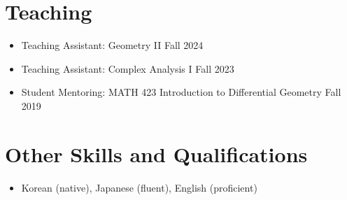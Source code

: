 \documentclass[11pt,a4paper]{article}
\begin{document}
\section*{Teaching}
\begin{itemize}
\item
	Teaching Assistant: Geometry II
	\hfill{\small Fall 2024}
\item
	Teaching Assistant: Complex Analysis I
	\hfill{\small Fall 2023}
\item
	Student Mentoring: MATH 423 Introduction to Differential Geometry
	\hfill{\small Fall 2019}\\
\end{itemize}




\section*{Other Skills and Qualifications}
\begin{itemize}
\item Korean (native), Japanese (fluent), English (proficient)
\end{itemize}
	
\end{document}
